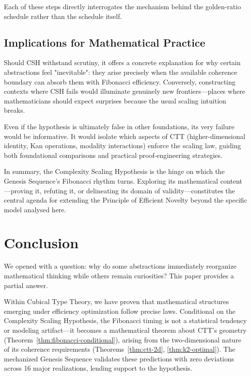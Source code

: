 \documentclass[11pt]{article}
\theoremstyle{definition}
\theoremstyle{plain}
\theoremstyle{remark}
\begin{document}
Each of these steps directly interrogates the mechanism behind the golden-ratio schedule rather than the schedule itself.

\subsection{Implications for Mathematical Practice}

Should CSH withstand scrutiny, it offers a concrete explanation for why certain abstractions feel "inevitable": they arise precisely when the available coherence boundary can absorb them with Fibonacci efficiency. Conversely, constructing contexts where CSH fails would illuminate genuinely new frontiers—places where mathematicians should expect surprises because the usual scaling intuition breaks.

Even if the hypothesis is ultimately false in other foundations, its very failure would be informative. It would isolate which aspects of CTT (higher-dimensional identity, Kan operations, modality interactions) enforce the scaling law, guiding both foundational comparisons and practical proof-engineering strategies.

In summary, the Complexity Scaling Hypothesis is the hinge on which the Genesis Sequence's Fibonacci rhythm turns. Exploring its mathematical content—proving it, refuting it, or delineating its domain of validity—constitutes the central agenda for extending the Principle of Efficient Novelty beyond the specific model analysed here.

\section{Conclusion}

We opened with a question: why do some abstractions immediately reorganize mathematical thinking while others remain curiosities? This paper provides a partial answer.

Within Cubical Type Theory, we have proven that mathematical structures emerging under efficiency optimization follow precise laws. Conditional on the Complexity Scaling Hypothesis, the Fibonacci timing is not a statistical tendency or modeling artifact—it becomes a mathematical theorem about CTT's geometry (Theorem~\ref{thm:fibonacci-conditional}), arising from the two-dimensional nature of its coherence requirements (Theorems~\ref{thm:ctt-2d}, \ref{thm:k2-optimal}). The mechanized Genesis Sequence validates these predictions with zero deviations across 16 major realizations, lending support to the hypothesis.
\end{document}
